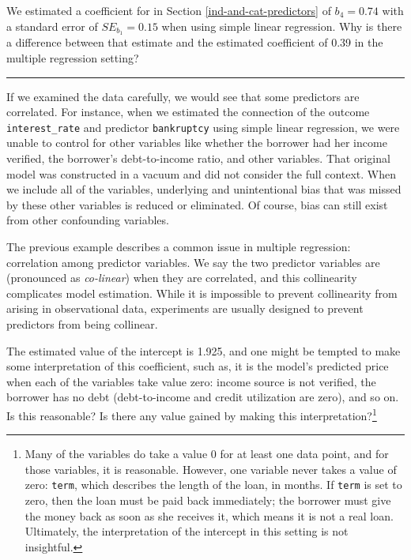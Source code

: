 \documentclass[
  10pt,
  openany]{book}
\theoremstyle{definition}
\theoremstyle{definition}
\theoremstyle{definition}
\theoremstyle{definition}
\theoremstyle{remark}
\begin{document}
We estimated a coefficient for in Section \ref{ind-and-cat-predictors} of \(b_4 = 0.74\) with a standard error of \(SE_{b_1} = 0.15\) when using simple linear regression.
Why is there a difference between that estimate and the estimated coefficient of 0.39 in the multiple regression setting?

\begin{center}\rule{0.5\linewidth}{0.5pt}\end{center}

If we examined the data carefully, we would see that some predictors are correlated.
For instance, when we estimated the connection of the outcome \texttt{interest\_rate} and predictor \texttt{bankruptcy} using simple linear regression, we were unable to control for other variables like whether the borrower had her income verified, the borrower's debt-to-income ratio, and other variables.
That original model was constructed in a vacuum and did not consider the full context.
When we include all of the variables, underlying and unintentional bias that was missed by these other variables is reduced or eliminated.
Of course, bias can still exist from other confounding variables.

The previous example describes a common issue in multiple regression: correlation among predictor variables.
We say the two predictor variables are (pronounced as \emph{co-linear}) when they are correlated, and this collinearity complicates model estimation.
While it is impossible to prevent collinearity from arising in observational data, experiments are usually designed to prevent predictors from being collinear.

The estimated value of the intercept is 1.925, and one might be tempted to make some interpretation of this coefficient, such as, it is the model's predicted price when each of the variables take value zero: income source is not verified, the borrower has no debt (debt-to-income and credit utilization are zero), and so on.
Is this reasonable?
Is there any value gained by making this interpretation?\footnote{Many of the variables do take a value 0 for at least one data point, and for those variables, it is reasonable. However, one variable never takes a value of zero: \texttt{term}, which describes the length of the loan, in months. If \texttt{term} is set to zero, then the loan must be paid back immediately; the borrower must give the money back as soon as she receives it, which means it is not a real loan. Ultimately, the interpretation of the intercept in this setting is not insightful.}
\end{document}
